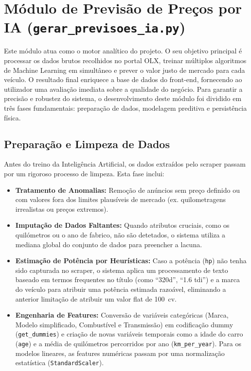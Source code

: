 \documentclass[11pt,a4paper]{article}
\begin{document}
\section{Módulo de Previsão de Preços por IA (\texttt{gerar\_previsoes\_ia.py})}
Este módulo atua como o motor analítico do projeto. O seu objetivo principal é processar os dados brutos recolhidos no portal OLX, treinar múltiplos algoritmos de Machine Learning em simultâneo e prever o valor justo de mercado para cada veículo. O resultado final enriquece a base de dados do front-end, fornecendo ao utilizador uma avaliação imediata sobre a qualidade do negócio. Para garantir a precisão e robustez do sistema, o desenvolvimento deste módulo foi dividido em três fases fundamentais: preparação de dados, modelagem preditiva e persistência física.

\subsection{Preparação e Limpeza de Dados}
Antes do treino da Inteligência Artificial, os dados extraídos pelo scraper passam por um rigoroso processo de limpeza. Esta fase inclui:
\begin{itemize}
    \item \textbf{Tratamento de Anomalias:} Remoção de anúncios sem preço definido ou com valores fora dos limites plausíveis de mercado (ex. quilometragens irrealistas ou preços extremos).
    \item \textbf{Imputação de Dados Faltantes:} Quando atributos cruciais, como os quilómetros ou o ano de fabrico, não são detetados, o sistema utiliza a mediana global do conjunto de dados para preencher a lacuna.
    \item \textbf{Estimação de Potência por Heurísticas:} Caso a potência (\texttt{hp}) não tenha sido capturada no scraper, o sistema aplica um processamento de texto baseado em termos frequentes no título (como ``320d'', ``1.6 tdi'') e a marca do veículo para atribuir uma potência estimada razoável, eliminando a anterior limitação de atribuir um valor flat de 100~cv.
    \item \textbf{Engenharia de Features:} Conversão de variáveis categóricas (Marca, Modelo simplificado, Combustível e Transmissão) em codificação dummy (\texttt{get\_dummies}) e criação de novas variáveis temporais como a idade do carro (\texttt{age}) e a média de quilómetros percorridos por ano (\texttt{km\_per\_year}). Para os modelos lineares, as features numéricas passam por uma normalização estatística (\texttt{StandardScaler}).
\end{itemize}
\end{document}
